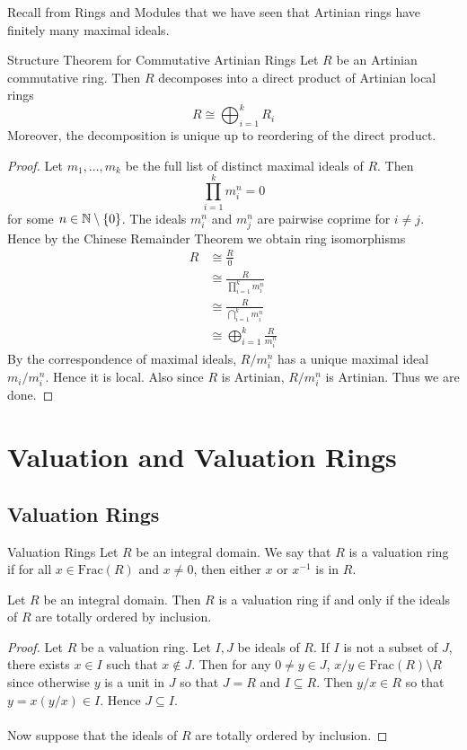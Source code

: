 \documentclass[a4paper]{article}
\begin{document}
Recall from Rings and Modules that we have seen that Artinian rings have finitely many maximal ideals. 

\begin{thm}{Structure Theorem for Commutative Artinian Rings}{} Let $R$ be an Artinian commutative ring. Then $R$ decomposes into a direct product of Artinian local rings $$R\cong\bigoplus_{i=1}^k R_i$$ Moreover, the decomposition is unique up to reordering of the direct product.  \tcbline
\begin{proof}
Let $m_1,\dots,m_k$ be the full list of distinct maximal ideals of $R$. Then $$\prod_{i=1}^km_i^n=0$$ for some $n\in\mathbb{N}\setminus\{0\}$. The ideals $m_i^n$ and $m_j^n$ are pairwise coprime for $i\neq j$. Hence by the Chinese Remainder Theorem we obtain ring isomorphisms 
\begin{align*}
R&\cong\frac{R}{0}\\
&\cong\frac{R}{\prod_{i=1}^km_i^n}\\
&\cong\frac{R}{\bigcap_{i=1}^km_i^n}\tag{$m_i^n$ and $m_j^n$ pairwise coprime}\\
&\cong\bigoplus_{i=1}^k\frac{R}{m_i^n}\tag{CRT}
\end{align*}
By the correspondence of maximal ideals, $R/m_i^n$ has a unique maximal ideal $m_i/m_i^n$. Hence it is local. Also since $R$ is Artinian, $R/m_i^n$ is Artinian. Thus we are done. 
\end{proof}
\end{thm}

\pagebreak
\section{Valuation and Valuation Rings}
\subsection{Valuation Rings}
\begin{defn}{Valuation Rings}{} Let $R$ be an integral domain. We say that $R$ is a valuation ring if for all $x\in\text{Frac}(R)$ and $x\neq 0$, then either $x$ or $x^{-1}$ is in $R$. 
\end{defn}

\begin{lmm}{}{} Let $R$ be an integral domain. Then $R$ is a valuation ring if and only if the ideals of $R$ are totally ordered by inclusion. \tcbline
\begin{proof}
Let $R$ be a valuation ring. Let $I,J$ be ideals of $R$. If $I$ is not a subset of $J$, there exists $x\in I$ such that $x\notin J$. Then for any $0\neq y\in J$, $x/y\in\text{Frac}(R)\setminus R$ since otherwise $y$ is a unit in $J$ so that $J=R$ and $I\subseteq R$. Then $y/x\in R$ so that $y=x(y/x)\in I$. Hence $J\subseteq I$. \\~\\

Now suppose that the ideals of $R$ are totally ordered by inclusion. 
\end{proof}
\end{lmm}
\end{document}
